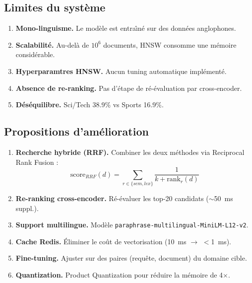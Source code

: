 \documentclass[12pt,a4paper]{article}
\begin{document}
\subsection{Limites du syst\`{e}me}

\begin{enumerate}
    \item \textbf{Mono-linguisme.} Le mod\`{e}le est entra\^{\i}n\'{e} sur des donn\'{e}es anglophones.
    \item \textbf{Scalabilit\'{e}.} Au-del\`{a} de $10^6$ documents, HNSW consomme une m\'{e}moire consid\'{e}rable.
    \item \textbf{Hyperparamtres HNSW.} Aucun tuning automatique impl\'{e}ment\'{e}.
    \item \textbf{Absence de re-ranking.} Pas d'\'{e}tape de r\'{e}-\'{e}valuation par cross-encoder.
    \item \textbf{D\'{e}s\'{e}quilibre.} Sci/Tech 38.9\% vs Sports 16.9\%.
\end{enumerate}

\subsection{Propositions d'am\'{e}lioration}

\begin{enumerate}
    \item \textbf{Recherche hybride (RRF).} Combiner les deux m\'{e}thodes via Reciprocal Rank Fusion :
    \begin{equation}
    \text{score}_{RRF}(d) = \sum_{r \in \{sem, lex\}} \frac{1}{k + \text{rank}_r(d)}
    \label{eq:rrf}
    \end{equation}

    \item \textbf{Re-ranking cross-encoder.} R\'{e}-\'{e}valuer les top-20 candidats ($\sim$50~ms suppl.).

    \item \textbf{Support multilingue.} Mod\`{e}le \texttt{paraphrase-multilingual-MiniLM-L12-v2}.

    \item \textbf{Cache Redis.} \'{E}liminer le co\^{u}t de vectorisation (10~ms $\rightarrow$ $<$1~ms).

    \item \textbf{Fine-tuning.} Ajuster sur des paires (requ\^{e}te, document) du domaine cible.

    \item \textbf{Quantization.} Product Quantization pour r\'{e}duire la m\'{e}moire de 4$\times$.
\end{enumerate}
\end{document}
